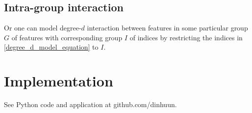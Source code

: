 \documentclass[14pt, reqno]{amsart}
\theoremstyle{definition}
\begin{document}
\subsection{Intra-group interaction} Or one can model degree-$d$ interaction between features in some particular group $G$ of features with corresponding group $I$ of indices by restricting the indices in \eqref{degree_d_model_equation} to $I$.

\section{Implementation} See Python code and application at github.com/dinhuun.

\newpage
\begin{bibdiv}
\begin{biblist}
\end{biblist}
\end{bibdiv}
\end{document}
